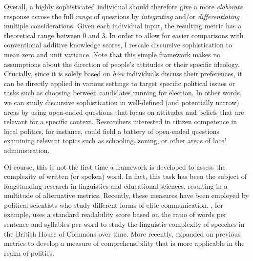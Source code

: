 Overall, a highly sophisticated individual should therefore give a more \textit{elaborate} response across the full \textit{range} of questions by \textit{integrating} and/or \textit{differentiating} multiple considerations. Given each individual input, the resulting metric has a theoretical range between 0 and 3. In order to allow for easier comparisons with conventional additive knowledge scores, I rescale discursive sophistication to mean zero and unit variance. Note that this simple framework makes no assumptions about the direction of people's attitudes or their specific ideology. Crucially, since it is solely based on \textit{how} individuals discuss their preferences, it can be directly applied in various settings to target specific political issues or tasks such as choosing between candidates running for election. In other words, we can study discursive sophistication in well-defined (and potentially narrow) areas by using open-ended questions that focus on attitudes and beliefs that are relevant for a specific context. Researchers interested in citizen competence in local politics, for instance, could field a battery of open-ended questions examining relevant topics such as schooling, zoning, or other areas of local administration.

Of course, this is not the first time a framework is developed to assess the complexity of written (or spoken) word. In fact, this task has been the subject of longstanding research in linguistics and educational sciences, resulting in a multitude of alternative metrics. Recently, these measures have been employed by political scientists who study different forms of elite communication. \citet{spirling2016democratization}, for example, uses a standard readability score based on the ratio of words per sentence and syllables per word to study the linguistic complexity of speeches in the British House of Commons over time. More recently, \citet{benoit2019measuring} expanded on previous metrics to develop a measure of comprehensibility that is more applicable in the realm of politics.

